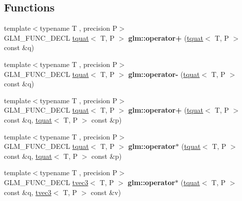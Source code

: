 \subsection*{Functions}
\begin{DoxyCompactItemize}
\item 
\mbox{\label{group__gtc__quaternion_ga6443d80d8429baec64193d0e31e580c8}} 
{\footnotesize template$<$typename T , precision P$>$ }\\G\+L\+M\+\_\+\+F\+U\+N\+C\+\_\+\+D\+E\+CL \hyperlink{structglm_1_1tquat}{tquat}$<$ T, P $>$ {\bfseries glm\+::operator+} (\hyperlink{structglm_1_1tquat}{tquat}$<$ T, P $>$ const \&q)
\item 
\mbox{\label{group__gtc__quaternion_ga76d2d3e18c09dbd336ba90b498fefbba}} 
{\footnotesize template$<$typename T , precision P$>$ }\\G\+L\+M\+\_\+\+F\+U\+N\+C\+\_\+\+D\+E\+CL \hyperlink{structglm_1_1tquat}{tquat}$<$ T, P $>$ {\bfseries glm\+::operator-\/} (\hyperlink{structglm_1_1tquat}{tquat}$<$ T, P $>$ const \&q)
\item 
\mbox{\label{group__gtc__quaternion_ga517657374d8ca180d63c33ff9430518a}} 
{\footnotesize template$<$typename T , precision P$>$ }\\G\+L\+M\+\_\+\+F\+U\+N\+C\+\_\+\+D\+E\+CL \hyperlink{structglm_1_1tquat}{tquat}$<$ T, P $>$ {\bfseries glm\+::operator+} (\hyperlink{structglm_1_1tquat}{tquat}$<$ T, P $>$ const \&q, \hyperlink{structglm_1_1tquat}{tquat}$<$ T, P $>$ const \&p)
\item 
\mbox{\label{group__gtc__quaternion_gabca7455f687e322b505531e15786d845}} 
{\footnotesize template$<$typename T , precision P$>$ }\\G\+L\+M\+\_\+\+F\+U\+N\+C\+\_\+\+D\+E\+CL \hyperlink{structglm_1_1tquat}{tquat}$<$ T, P $>$ {\bfseries glm\+::operator$\ast$} (\hyperlink{structglm_1_1tquat}{tquat}$<$ T, P $>$ const \&q, \hyperlink{structglm_1_1tquat}{tquat}$<$ T, P $>$ const \&p)
\item 
\mbox{\label{group__gtc__quaternion_ga492a3382ec9903561f2fdf46b61cc413}} 
{\footnotesize template$<$typename T , precision P$>$ }\\G\+L\+M\+\_\+\+F\+U\+N\+C\+\_\+\+D\+E\+CL \hyperlink{structglm_1_1tvec3}{tvec3}$<$ T, P $>$ {\bfseries glm\+::operator$\ast$} (\hyperlink{structglm_1_1tquat}{tquat}$<$ T, P $>$ const \&q, \hyperlink{structglm_1_1tvec3}{tvec3}$<$ T, P $>$ const \&v)

\end{DoxyCompactItemize}
